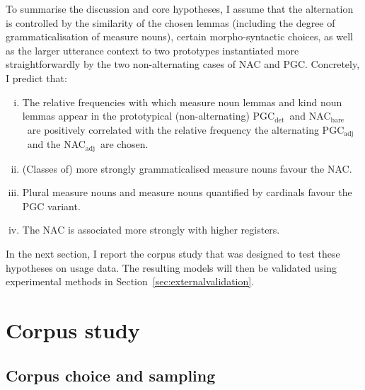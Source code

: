 \documentclass[USenglish]{article}
\newcommand{\Sub}[1]{\ensuremath{\mathrm{_{#1}}}}
\newcommand{\NACb}{NAC\Sub{bare}}
\newcommand{\NACa}{NAC\Sub{adj}}
\newcommand{\PGCd}{PGC\Sub{det}}
\newcommand{\PGCa}{PGC\Sub{adj}}
\begin{document}
To summarise the discussion and core hypotheses, I assume that the alternation is controlled by the similarity of the chosen lemmas (including the degree of grammaticalisation of measure nouns), certain morpho-syntactic choices, as well as the larger utterance context to two prototypes instantiated more straightforwardly by the two non-alternating cases of NAC and PGC.
Concretely, I predict that:

\begin{enumerate}[i.]
  \item The relative frequencies with which measure noun lemmas and kind noun lemmas appear in the prototypical (non-alternating) \PGCd\ and \NACb\ are positively correlated with the relative frequency the alternating \PGCa\ and the \NACa\ are chosen.
  \item (Classes of) more strongly grammaticalised measure nouns favour the NAC.
  \item Plural measure nouns and measure nouns quantified by cardinals favour the PGC variant.
  \item The NAC is associated more strongly with higher registers.
\end{enumerate}

\vspace{-1\baselineskip}

In the next section, I report the corpus study that was designed to test these hypotheses on usage data.
The resulting models will then be validated using experimental methods in Section~\ref{sec:externalvalidation}.





\section{Corpus study}
\label{sec:corpusstudies}


\subsection{Corpus choice and sampling}
\label{sec:gettingdata}

\end{document}

